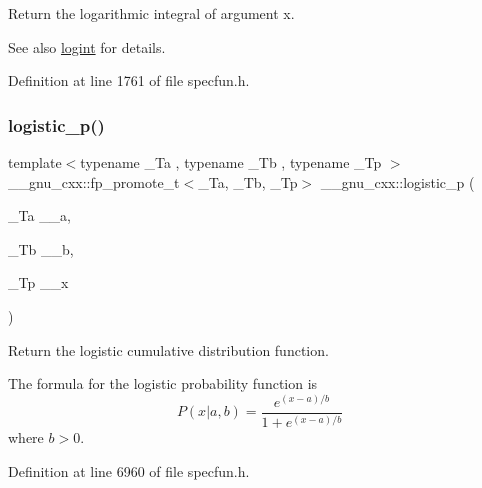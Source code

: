 Return the logarithmic integral of argument {\ttfamily x}.

\begin{DoxySeeAlso}{See also}
\hyperlink{group__mathsf__gnu_ga1c0fe0f4cb72041f24db82dc7e47df11}{logint} for details. 
\end{DoxySeeAlso}


Definition at line 1761 of file specfun.\+h.

\mbox{\label{group__mathsf__gnu_ga5a5d9c5e7ab822f84578415be8609f49}} 
\subsubsection{\texorpdfstring{logistic\+\_\+p()}{logistic\_p()}}
{\footnotesize\ttfamily template$<$typename \+\_\+\+Ta , typename \+\_\+\+Tb , typename \+\_\+\+Tp $>$ \\
\+\_\+\+\_\+gnu\+\_\+cxx\+::fp\+\_\+promote\+\_\+t$<$\+\_\+\+Ta, \+\_\+\+Tb, \+\_\+\+Tp$>$ \+\_\+\+\_\+gnu\+\_\+cxx\+::logistic\+\_\+p (\begin{DoxyParamCaption}\item[{\+\_\+\+Ta}]{\+\_\+\+\_\+a,  }\item[{\+\_\+\+Tb}]{\+\_\+\+\_\+b,  }\item[{\+\_\+\+Tp}]{\+\_\+\+\_\+x }\end{DoxyParamCaption})\hspace{0.3cm}{\ttfamily [inline]}}



Return the logistic cumulative distribution function. 

The formula for the logistic probability function is \[ P(x| a, b) = \frac{e^{(x - a)/b}}{1 + e^{(x - a)/b}} \] where $b > 0$. 

Definition at line 6960 of file specfun.\+h.

\mbox{\label{group__mathsf__gnu_gaeb3e768c11c8cd11804827a09f19b1e3}} 
